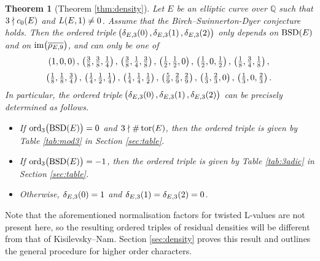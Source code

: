 \documentclass{article}
\theoremstyle{plain}
\newtheorem{theorem}[n]{Theorem}
\theoremstyle{definition}
\newcommand{\BSD}{\operatorname{BSD}}
\newcommand{\im}{\operatorname{im}}
\newcommand{\ord}{\operatorname{ord}}
\newcommand{\QQ}{\mathbb{Q}}
\newcommand{\tor}{\operatorname{tor}}
\newcommand{\br}{\!\del}
\begin{document}
\begin{theorem}[Theorem \ref{thm:density}]
Let $ E $ be an elliptic curve over $ \QQ $ such that $ 3 \nmid c_0\br{E} $ and $ L\br{E, 1} \ne 0 $. Assume that the Birch--Swinnerton-Dyer conjecture holds. Then the ordered triple $ \br{\delta_{E, 3}\br{0}, \delta_{E, 3}\br{1}, \delta_{E, 3}\br{2}} $ only depends on $ \BSD\br{E} $ and on $ \im\br{\overline{\rho_{E, 9}}} $, and can only be one of
$$ \br{1, 0, 0}, \ \br{\tfrac{3}{8}, \tfrac{3}{8}, \tfrac{1}{4}}, \ \br{\tfrac{3}{8}, \tfrac{1}{4}, \tfrac{3}{8}}, \ \br{\tfrac{1}{2}, \tfrac{1}{2}, 0}, \ \br{\tfrac{1}{2}, 0, \tfrac{1}{2}}, \ \br{\tfrac{1}{8}, \tfrac{3}{4}, \tfrac{1}{8}}, $$
$$ \br{\tfrac{1}{8}, \tfrac{1}{8}, \tfrac{3}{4}}, \ \br{\tfrac{1}{4}, \tfrac{1}{2}, \tfrac{1}{4}}, \ \br{\tfrac{1}{4}, \tfrac{1}{4}, \tfrac{1}{2}}, \ \br{\tfrac{5}{9}, \tfrac{2}{9}, \tfrac{2}{9}}, \ \br{\tfrac{1}{3}, \tfrac{2}{3}, 0}, \ \br{\tfrac{1}{3}, 0, \tfrac{2}{3}}. $$
In particular, the ordered triple $ \br{\delta_{E, 3}\br{0}, \delta_{E, 3}\br{1}, \delta_{E, 3}\br{2}} $ can be precisely determined as follows.
\begin{itemize}
\item If $ \ord_3\br{\BSD\br{E}} = 0 $ and $ 3 \nmid \#\tor\br{E} $, then the ordered triple is given by Table \ref{tab:mod3} in Section \ref{sec:table}.
\item If $ \ord_3\br{\BSD\br{E}} = -1 $, then the ordered triple is given by Table \ref{tab:3adic} in Section \ref{sec:table}.
\item Otherwise, $ \delta_{E, 3}\br{0} = 1 $ and $ \delta_{E, 3}\br{1} = \delta_{E, 3}\br{2} = 0 $.
\end{itemize}
\end{theorem}

Note that the aforementioned normalisation factors for twisted L-values are not present here, so the resulting ordered triples of residual densities will be different from that of Kisilevsky--Nam. Section \ref{sec:density} proves this result and outlines the general procedure for higher order characters.
\end{document}
